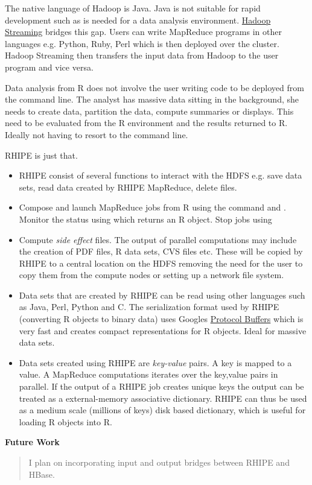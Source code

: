 \documentclass[letterpaper,10pt,english]{sphinxmanual}
\begin{document}
The native language of Hadoop is Java. Java is not suitable for rapid
development such as is needed for a data analysis environment. \href{http://hadoop.apache.org/common/docs/current/streaming.html}{Hadoop Streaming}
bridges this gap. Users can write MapReduce programs in other languages
e.g. Python, Ruby, Perl which is then deployed over the cluster. Hadoop
Streaming then transfers the input data from Hadoop to the user program and vice
versa.

Data analysis from R does not involve the user writing code to be deployed from
the command line. The analyst has massive data sitting in the background, she
needs to create data, partition the data, compute summaries or displays. This
need to be evaluated from the R environment and the results returned to
R. Ideally not having to resort to the command line.

RHIPE is just that.
\begin{itemize}
\item {} 
RHIPE consist of several functions to interact with the HDFS e.g. save data
sets, read data created by RHIPE MapReduce, delete files.

\item {} 
Compose and launch MapReduce jobs from R using the command  and
. Monitor the status using  which returns an R
object. Stop jobs using 

\item {} 
Compute \emph{side effect} files. The output of parallel computations may include
the creation of PDF files, R data sets, CVS files etc. These will be copied by
RHIPE to a central location on the HDFS removing the need for the user to copy
them from the compute nodes or setting up a network file system.

\item {} 
Data sets that are created by RHIPE can be read using other languages such as
Java, Perl, Python and C. The serialization format used by RHIPE (converting R
objects to binary data) uses Googles \href{http://code.google.com/p/protobuf/}{Protocol Buffers} which is very fast and creates compact
representations for R objects. Ideal for massive data sets.

\item {} 
Data sets created using RHIPE are \emph{key-value} pairs. A key is mapped to a
value. A MapReduce computations iterates over the key,value pairs in
parallel. If the output of a RHIPE job creates unique keys the output can be
treated as a external-memory associative dictionary. RHIPE can thus be used as
a medium scale (millions of keys) disk based dictionary, which is useful for
loading R objects into R.

\end{itemize}
\textbf{Future Work}
\begin{quote}

I plan on incorporating input and output bridges between RHIPE and
HBase.
\end{quote}
\end{document}
